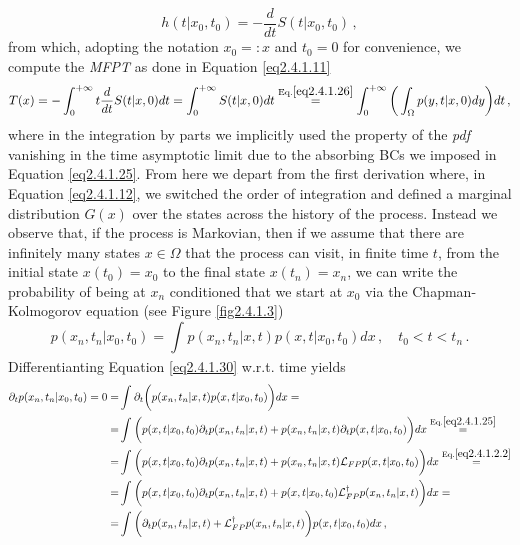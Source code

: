\documentclass[../main.tex]{subfiles}
\begin{document}
\begin{equation}\label{eq2.4.1.28}
     h(t|x_{0}, t_{0})=-\frac{d}{dt}S(t|x_{0}, t_{0})\,,
\end{equation}
from which, adopting the notation $x_{0}=:x$ and $t_{0}=0$ for convenience, we compute the \textit{MFPT} as done in Equation \eqref{eq2.4.1.11}
\begin{equation}\label{eq2.4.1.29}
        T(x)=-\int_{0}^{+\infty}t\frac{d}{dt}S(t|x,0)dt=\int_{0}^{+\infty}S(t|x,0)dt\stackrel{\text{Eq.}\eqref{eq2.4.1.26}}{=}\int_{0}^{+\infty}\bigg(\int_{\Omega}^{}p(y,t|x,0)dy\bigg)dt\,,
\end{equation}
where in the integration by parts we implicitly used the property of the \textit{pdf} vanishing in the time asymptotic limit due to the absorbing BCs we imposed in Equation \eqref{eq2.4.1.25}.
From here we depart from the first derivation where, in Equation \eqref{eq2.4.1.12}, we switched the order of integration and defined a marginal distribution $G(x)$ over the states across the history of the process.
Instead we observe that, if the process is Markovian, then if we assume that there are infinitely many states $x\in\Omega$ that the process can visit, in finite time $t$, from the initial state $x(t_{0})=x_{0}$ to the final state $x(t_{n})=x_{n}$, we can write the probability of being at $x_{n}$ conditioned that we start at $x_{0}$ via the Chapman-Kolmogorov equation (see Figure \ref{fig2.4.1.3}) 
\begin{equation}\label{eq2.4.1.30}
    p(x_{n},t_{n}|x_{0},t_{0})=\int_{}^{}p(x_{n}, t_{n}|x,t)p(x,t|x_{0},t_{0})dx\,,\quad t_{0}<t<t_{n}\,.
\end{equation}
Differentianting Equation \eqref{eq2.4.1.30} w.r.t. time yields
\begin{align*}
        \partial_{t}p(x_{n},t_{n}|x_{0},t_{0}) = 0 =& \int_{}^{}\partial_{t}\bigg(p(x_{n}, t_{n}|x,t)p(x,t|x_{0},t_{0})\bigg)dx = \nonumber \\
        =& \int_{}^{}\bigg(p(x,t|x_{0},t_{0})\partial_{t}p(x_{n}, t_{n}|x,t) + p(x_{n}, t_{n}|x,t)\partial_{t}p(x,t|x_{0},t_{0})\bigg)dx \stackrel{\text{Eq.}\eqref{eq2.4.1.25}}= \nonumber \\
        =& \int_{}^{}\bigg(p(x,t|x_{0},t_{0})\partial_{t}p(x_{n}, t_{n}|x,t) + p(x_{n}, t_{n}|x,t)\mathcal{L}_{FP}p(x,t|x_{0},t_{0})\bigg)dx \stackrel{\text{Eq.}\eqref{eq2.4.1.2.2}}{=} \nonumber \\
        =& \int_{}^{}\bigg(p(x,t|x_{0},t_{0})\partial_{t}p(x_{n}, t_{n}|x,t) + p(x,t|x_{0},t_{0})\mathcal{L}^{\dagger}_{FP}p(x_{n}, t_{n}|x,t)\bigg)dx = \nonumber \\
        =& \int_{}^{}\bigg(\partial_{t}p(x_{n}, t_{n}|x,t) + \mathcal{L}^{\dagger}_{FP}p(x_{n}, t_{n}|x,t)\bigg)p(x,t|x_{0},t_{0})dx\,,
\end{align*}
\end{document}
